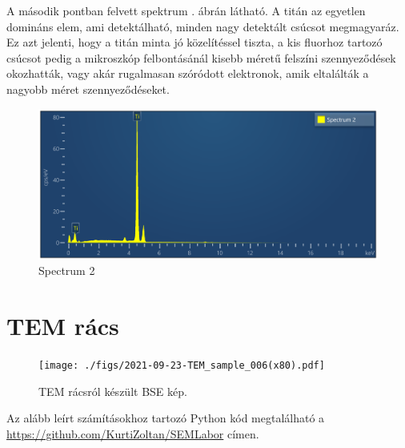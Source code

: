 \documentclass[pdftex,12pt,a4paper]{article}
\begin{document}
			A második pontban felvett spektrum . ábrán látható. A titán az egyetlen domináns elem, ami detektálható, minden nagy detektált csúcsot megmagyaráz. Ez azt jelenti, hogy a titán minta jó közelítéssel tiszta, a kis fluorhoz tartozó csúcsot pedig a mikroszkóp felbontásánál kisebb méretű felszíni szennyeződések okozhatták, vagy akár rugalmasan szóródott elektronok, amik eltalálták a nagyobb méret szennyeződéseket.
			\begin{figure}[H]
				\centering
				\includegraphics[scale=0.7]{./figs/spectrum2.png}
				\caption{Spectrum 2}
				\label{spectrum2}
			\end{figure}
	\section{TEM rács}
		\begin{figure}[H]
			\centering
			\texttt{[image: ./figs/2021-09-23-TEM\_sample\_006(x80).pdf]}
			\caption{TEM rácsról készült BSE kép.}
			\label{temgrid}
		\end{figure}
		Az alább leírt számításokhoz tartozó Python kód megtalálható a \url{https://github.com/KurtiZoltan/SEMLabor} címen.
		
\end{document}
